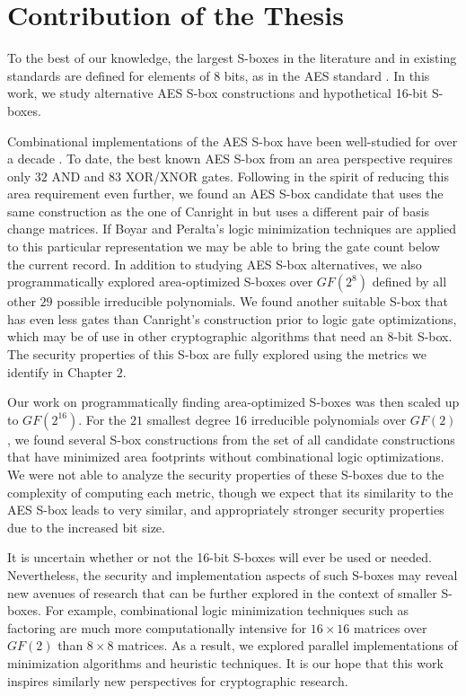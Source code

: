 \section{Contribution of the Thesis}
To the best of our knowledge, the largest S-boxes in the literature and in existing standards are defined for elements of $8$ bits, as in the AES standard \cite{Daemen02-1}. In this work, we study alternative AES S-box constructions and hypothetical 16-bit S-boxes. 

Combinational implementations of the AES S-box have been well-studied for over a decade \cite{Rudra01-1, Satoh01-1, Mentens05-1, Canright05-1, Boyar12-1}. To date, the best known AES S-box from an area perspective requires only $32$ AND and $83$ XOR/XNOR gates. Following in the spirit of reducing this area requirement even further, we found an AES S-box candidate that uses the same construction as the one of Canright in \cite{Canright05-1} but uses a different pair of basis change matrices. If Boyar and Peralta's logic minimization techniques are applied to this particular representation we may be able to bring the gate count below the current record. In addition to studying AES S-box alternatives, we also programmatically explored area-optimized S-boxes over $GF(2^8)$ defined by all other $29$ possible irreducible polynomials. We found another suitable S-box that has even less gates than Canright's construction prior to logic gate optimizations, which may be of use in other cryptographic algorithms that need an $8$-bit S-box. The security properties of this S-box are fully explored using the metrics we identify in Chapter $2$.

Our work on programmatically finding area-optimized S-boxes was then scaled up to $GF(2^{16})$. For the $21$ smallest degree 16 irreducible polynomials over $GF(2)$, we found several S-box constructions from the set of all candidate constructions that have minimized area footprints without combinational logic optimizations. We were not able to analyze the security properties of these S-boxes due to the complexity of computing each metric, though we expect that its similarity to the AES S-box leads to very similar, and appropriately stronger security properties due to the increased bit size.

It is uncertain whether or not the 16-bit S-boxes will ever be used or needed. Nevertheless, the security and implementation aspects of such S-boxes may reveal new avenues of research that can be further explored in the context of smaller S-boxes. For example, combinational logic minimization techniques such as factoring are much more computationally intensive for $16 \times 16$ matrices over $GF(2)$ than $8 \times 8$ matrices. As a result, we explored parallel implementations of minimization algorithms and heuristic techniques. It is our hope that this work inspires similarly new perspectives for cryptographic research.

